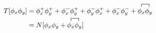 \documentclass[margin=3pt]{standalone}
\begin{document}
\fontsize{14}{16}
$\displaystyle
\begin{aligned}
    T[\phi_x \phi_y]
    &= \phi_x^+ \phi_y^+ + \phi_x^- \phi_y^+
    + \phi_y^- \phi_x^+ + \phi_x^- \phi_y^-
    + \contraction[1ex]{}{\phi_x}{}{\phi_y}
    \phi_x \phi_y
    \\
    &= N[
        \phi_x \phi_y + 
        \contraction[1ex]{}{\phi_x}{}{\phi_y}
        \phi_x \phi_y
    ]
\end{aligned}
$
    
\end{document}
